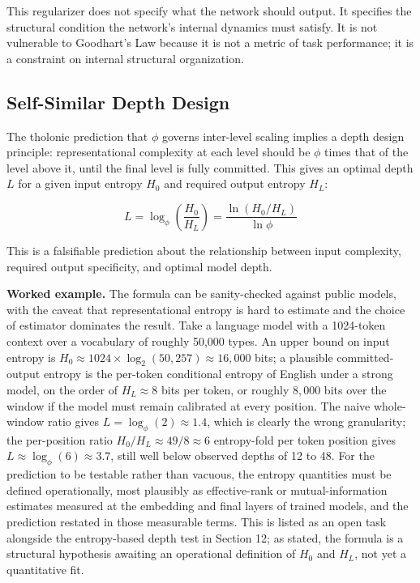 \documentclass[12pt]{article}
\begin{document}
This regularizer does not specify what the network should output. It
specifies the structural condition the network's internal dynamics must
satisfy. It is not vulnerable to Goodhart's Law because it is not a
metric of task performance; it is a constraint on internal structural
organization.

\subsection{Self-Similar Depth Design}\label{self-similar-depth-design}

The tholonic prediction that \(\phi\) governs inter-level scaling
implies a depth design principle: representational complexity at each
level should be \(\phi\) times that of the level above it, until the
final level is fully committed. This gives an optimal depth \(L\) for a
given input entropy \(H_0\) and required output entropy \(H_L\):

\[L = \log_\phi \left( \frac{H_0}{H_L} \right) = \frac{\ln(H_0/H_L)}{\ln \phi}\]

This is a falsifiable prediction about the relationship between input
complexity, required output specificity, and optimal model depth.

\textbf{Worked example.} The formula can be sanity-checked against
public models, with the caveat that representational entropy is hard to
estimate and the choice of estimator dominates the result. Take a
language model with a 1024-token context over a vocabulary of roughly
50,000 types. An upper bound on input entropy is
\(H_0 \approx 1024 \times \log_2(50{,}257) \approx 16{,}000\) bits; a
plausible committed-output entropy is the per-token conditional entropy
of English under a strong model, on the order of \(H_L \approx 8\) bits
per token, or roughly \(8{,}000\) bits over the window if the model must
remain calibrated at every position. The naive whole-window ratio gives
\(L = \log_\phi(2) \approx 1.4\), which is clearly the wrong
granularity; the per-position ratio \(H_0/H_L \approx 49/8 \approx 6\)
entropy-fold per token position gives
\(L \approx \log_\phi(6) \approx 3.7\), still well below observed depths
of 12 to 48. For the prediction to be testable rather than vacuous, the
entropy quantities must be defined operationally, most plausibly as
effective-rank or mutual-information estimates measured at the embedding
and final layers of trained models, and the prediction restated in those
measurable terms. This is listed as an open task alongside the
entropy-based depth test in Section 12; as stated, the formula is a
structural hypothesis awaiting an operational definition of \(H_0\) and
\(H_L\), not yet a quantitative fit.
\end{document}
